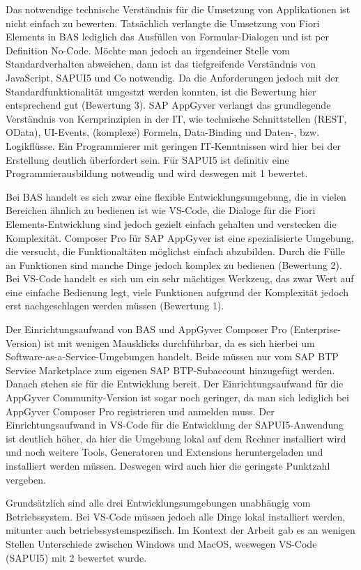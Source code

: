 Das notwendige technische Verständnis für die Umsetzung von Applikationen ist nicht einfach zu bewerten. Tatsächlich verlangte die Umsetzung von Fiori Elements in BAS lediglich das Ausfüllen von Formular-Dialogen und ist per Definition No-Code. Möchte man jedoch an irgendeiner Stelle vom Standardverhalten abweichen, dann ist das tiefgreifende Verständnis von JavaScript, SAPUI5 und Co notwendig. Da die Anforderungen jedoch mit der Standardfunktionalität umgestzt werden konnten, ist die Bewertung hier entsprechend gut (Bewertung 3). SAP AppGyver verlangt das grundlegende Verständnis von Kernprinzipien in der IT, wie technische Schnittstellen (REST, OData), UI-Events, (komplexe) Formeln, Data-Binding und Daten-, bzw. Logikflüsse. Ein Programmierer mit geringen IT-Kenntnissen wird hier bei der Erstellung deutlich überfordert sein. Für SAPUI5 ist definitiv eine Programmierausbildung notwendig und wird deswegen mit 1 bewertet.

Bei BAS handelt es sich zwar eine flexible Entwicklungsumgebung, die in vielen Bereichen ähnlich zu bedienen ist wie VS-Code, die Dialoge für die Fiori Elements-Entwicklung sind jedoch gezielt einfach gehalten und verstecken die Komplexität. Composer Pro für SAP AppGyver ist eine spezialisierte Umgebung, die versucht, die Funktionaltäten möglichst einfach abzubilden. Durch die Fülle an Funktionen sind manche Dinge jedoch komplex zu bedienen (Bewertung 2). Bei VS-Code handelt es sich um ein sehr mächtiges Werkzeug, das zwar Wert auf eine einfache Bedienung legt, viele Funktionen aufgrund der Komplexität jedoch erst nachgeschlagen werden müssen (Bewertung 1).

Der Einrichtungsaufwand von BAS und AppGyver Composer Pro (Enterprise-Version) ist mit wenigen Mausklicks durchführbar, da es sich hierbei um Software-as-a-Service-Umgebungen handelt. Beide müssen nur vom SAP BTP Service Marketplace zum eigenen SAP BTP-Subaccount hinzugefügt werden. Danach stehen sie für die Entwicklung bereit. Der Einrichtungsaufwand für die AppGyver Community-Version ist sogar noch geringer, da man sich lediglich bei AppGyver Composer Pro registrieren und anmelden muss. Der Einrichtungsaufwand in VS-Code für die Entwicklung der SAPUI5-Anwendung ist deutlich höher, da hier die Umgebung lokal auf dem Rechner installiert wird und noch weitere Tools, Generatoren und Extensions heruntergeladen und installiert werden müssen. Deswegen wird auch hier die geringste Punktzahl vergeben.

Grundsätzlich sind alle drei Entwicklungsumgebungen unabhängig vom Betriebssystem. Bei VS-Code müssen jedoch alle Dinge lokal installiert werden, mitunter auch betriebssystemspezifisch. Im Kontext der Arbeit gab es an wenigen Stellen Unterschiede zwischen Windows und MacOS, weswegen VS-Code (SAPUI5) mit 2 bewertet wurde.

